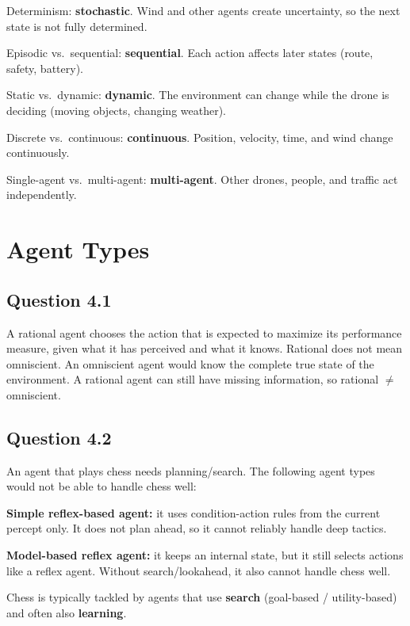 \documentclass[paper=a4, fontsize=11pt]{scrartcl}
\begin{document}
Determinism: \textbf{stochastic}.
Wind and other agents create uncertainty, so the next state is not fully determined.

Episodic vs.\ sequential: \textbf{sequential}.
Each action affects later states (route, safety, battery).

Static vs.\ dynamic: \textbf{dynamic}.
The environment can change while the drone is deciding (moving objects, changing weather).

Discrete vs.\ continuous: \textbf{continuous}.
Position, velocity, time, and wind change continuously.

Single-agent vs.\ multi-agent: \textbf{multi-agent}.
Other drones, people, and traffic act independently.

\section{Agent Types}

\subsection*{Question 4.1}
A rational agent chooses the action that is expected to maximize its performance measure,
given what it has perceived and what it knows.
Rational does not mean omniscient.
An omniscient agent would know the complete true state of the environment.
A rational agent can still have missing information, so rational $\neq$ omniscient.

\subsection*{Question 4.2}
An agent that plays chess needs planning/search.
The following agent types would not be able to handle chess well:

\textbf{Simple reflex-based agent:}
it uses condition-action rules from the current percept only.
It does not plan ahead, so it cannot reliably handle deep tactics.

\textbf{Model-based reflex agent:}
it keeps an internal state, but it still selects actions like a reflex agent.
Without search/lookahead, it also cannot handle chess well.

Chess is typically tackled by agents that use \textbf{search} (goal-based / utility-based)
and often also \textbf{learning}.
\end{document}
